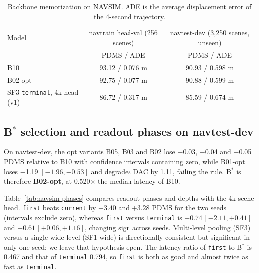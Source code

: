 \documentclass[10pt]{article}
\newcommand{\Bstar}{B$^{*}$}
\newcommand{\first}{\texttt{first}}
\newcommand{\current}{\texttt{current}}
\newcommand{\terminal}{\texttt{terminal}}
\begin{document}
\begin{table}[t]
\caption{Backbone memorization on NAVSIM. ADE is the average displacement error of the 4-second trajectory.}
\label{tab:memo}
\begin{center}
\small
\begin{tabular}{lcc}
\toprule
Model & navtrain head-val (256 scenes) & navtest-dev (3,250 scenes, unseen) \\
 & PDMS / ADE & PDMS / ADE \\
\midrule
B10 & 93.12 / 0.076 m & 90.93 / 0.598 m \\
B02-opt & 92.75 / 0.077 m & 90.88 / 0.599 m \\
SF3-\terminal{}, 4k head (v1) & 86.72 / 0.317 m & 85.59 / 0.674 m \\
\bottomrule
\end{tabular}
\end{center}
\end{table}

\subsection{\Bstar{} selection and readout phases on navtest-dev}
\label{sec:navsim-dev}

On navtest-dev, the opt variants B05, B03 and B02 lose $-$0.03, $-$0.04 and $-$0.05 PDMS relative to B10 with confidence intervals containing zero, while B01-opt loses $-$1.19 $[-1.96, -0.53]$ and degrades DAC by 1.11, failing the rule. \Bstar{} is therefore \textbf{B02-opt}, at 0.520$\times$ the median latency of B10.

Table~\ref{tab:navsim-phases} compares readout phases and depths with the 4k-scene head. \first{} beats \current{} by $+3.40$ and $+3.28$ PDMS for the two seeds (intervals exclude zero), whereas \first{} versus \terminal{} is $-0.74\,[-2.11, +0.41]$ and $+0.61\,[+0.06, +1.16]$, changing sign across seeds. Multi-level pooling (SF3) versus a single wide level (SF1-wide) is directionally consistent but significant in only one seed; we leave that hypothesis open. The latency ratio of \first{} to \Bstar{} is 0.467 and that of \terminal{} 0.794, so \first{} is both as good and almost twice as fast as \terminal{}.
\end{document}
